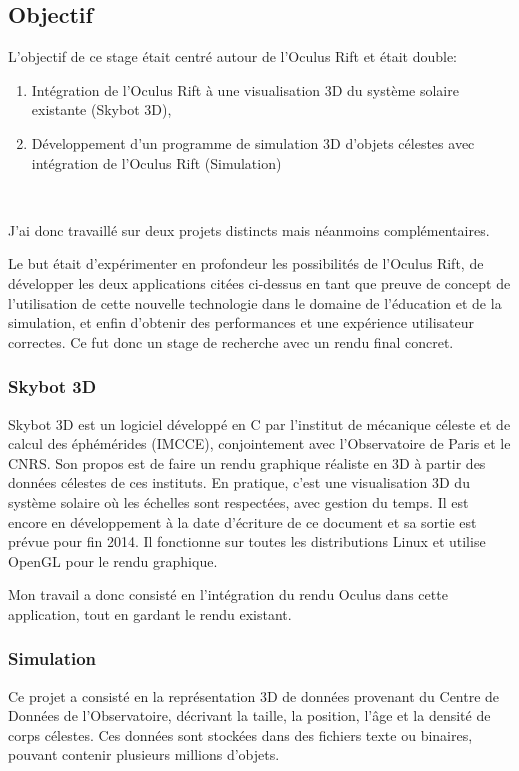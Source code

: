 \documentclass[a4paper,french,12pt]{article}
\begin{document}
	\subsection{Objectif}

		L’objectif de ce stage était centré autour de l'Oculus Rift et était double:\\

		\begin{enumerate}
		\item Intégration de l'Oculus Rift à une visualisation 3D du système solaire existante (Skybot 3D),
		\item Développement d'un programme de simulation 3D  d'objets célestes avec intégration de l'Oculus Rift (Simulation)
		\end{enumerate}~

		J'ai donc travaillé sur deux projets distincts mais néanmoins complémentaires.

		Le but était d'expérimenter en profondeur les possibilités de l'Oculus Rift, de développer
		les deux applications citées ci-dessus en tant que preuve de concept de l'utilisation de cette nouvelle technologie
		dans le domaine de l'éducation et de la simulation, et enfin d'obtenir des performances et une expérience
		utilisateur correctes. Ce fut donc un stage de recherche avec un rendu final concret.

	    \subsubsection{Skybot 3D}
		Skybot 3D est un logiciel développé en C par l'institut de mécanique céleste et de calcul des éphémérides (IMCCE),
		conjointement avec l'Observatoire de Paris et le CNRS. Son propos est de faire un rendu graphique réaliste
		en 3D à partir des données célestes de ces instituts. En pratique, c'est une visualisation 3D du système solaire
		où les échelles sont respectées, avec gestion du temps. Il est encore en développement à la date d'écriture de ce document et
		sa sortie est prévue pour fin 2014.
		Il fonctionne sur toutes les distributions Linux et utilise OpenGL pour le rendu graphique.

		Mon travail a donc consisté en l'intégration du rendu Oculus dans cette application, tout en gardant
		le rendu existant.

	    \subsubsection{Simulation}
		Ce projet a consisté en la représentation 3D de données provenant du Centre de Données
		de l'Observatoire, décrivant la taille, la position, l'âge et la densité de corps célestes.
		Ces données sont stockées dans des fichiers texte ou binaires, pouvant contenir plusieurs millions
		d'objets.
\end{document}
